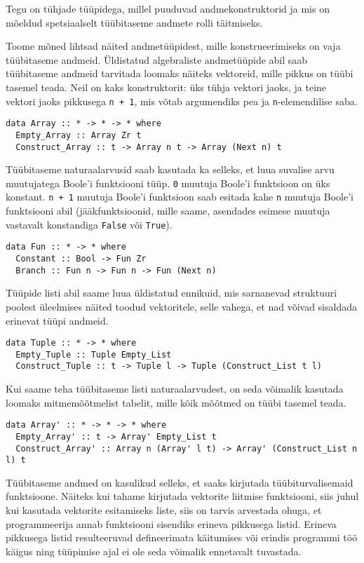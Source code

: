 \documentclass[12pt]{article}
\begin{document}
      Tegu on tühjade tüüpidega, millel puuduvad andmekonstruktorid ja mis on mõeldud spetsiaalselt tüübitaseme andmete rolli täitmiseks.

      Toome mõned lihtsad näited andmetüüpidest, mille konstrueerimiseks on vaja tüübitaseme andmeid. Üldistatud algebraliste andmetüüpide abil saab tüübitaseme andmeid tarvitada loomaks näiteks vektoreid, mille pikkus on tüübi tasemel teada. Neil on kaks konstruktorit: üks tühja vektori jaoks, ja teine vektori jaoks pikkusega \verb!n + 1!, mis võtab argumendiks pea ja \verb!n!-elemendilise saba.

      \begin{verbatim}data Array :: * -> * -> * where
  Empty_Array :: Array Zr t
  Construct_Array :: t -> Array n t -> Array (Next n) t\end{verbatim}

      Tüübitaseme naturaalarvusid saab kasutada ka selleks, et luua suvalise arvu muutujatega Boole'i funktsiooni tüüp. \verb!0! muutuja Boole'i funktsioon on üks konstant. \verb!n + 1! muutuja Boole'i funktsioon saab esitada kahe \verb!n! muutuja Boole'i funktsiooni abil (jääkfunktsioonid, mille saame, asendades esimese muutuja vastavalt konstandiga \verb!False! või \verb!True!).

      \begin{verbatim}data Fun :: * -> * where
  Constant :: Bool -> Fun Zr
  Branch :: Fun n -> Fun n -> Fun (Next n)\end{verbatim}

      Tüüpide listi abil saame luua üldistatud ennikuid, mis sarnanevad struktuuri poolest üleelmises näited toodud vektoritele, selle vahega, et nad võivad sisaldada erinevat tüüpi andmeid.

      \begin{verbatim}data Tuple :: * -> * where
  Empty_Tuple :: Tuple Empty_List
  Construct_Tuple :: t -> Tuple l -> Tuple (Construct_List t l)\end{verbatim}

      Kui saame teha tüübitaseme listi naturaalarvudest, on seda võimalik kasutada loomaks mitmemõõtmelist tabelit, mille kõik mõõtmed on tüübi tasemel teada.

      \begin{verbatim}data Array' :: * -> * -> * where
  Empty_Array' :: t -> Array' Empty_List t
  Construct_Array' :: Array n (Array' l t) -> Array' (Construct_List n l) t\end{verbatim}

      Tüübitaseme andmed on kasulikud selleks, et saaks kirjutada tüübiturvalisemaid funktsioone. Näiteks kui tahame kirjutada vektorite liitmise funktsiooni, siis juhul kui kasutada vektorite esitamiseks liste, siis on tarvis arvestada ohuga, et programmeerija annab funktsiooni sisendiks erineva pikkusega listid. Erineva pikkusega listid resulteeruvad defineerimata käitumises või erindis programmi töö käigus ning tüüpimise ajal ei ole seda võimalik ennetavalt tuvastada.
\end{document}

